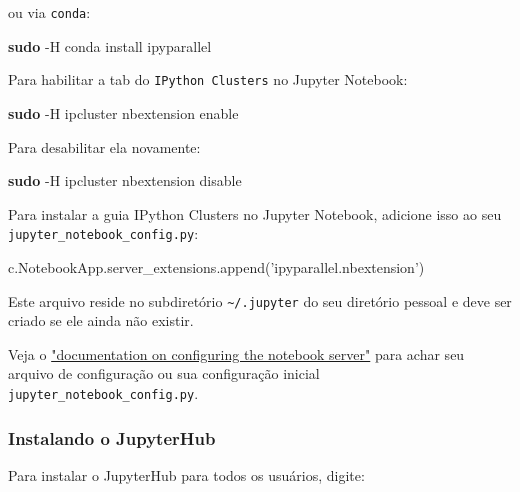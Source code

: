 \documentclass[11pt]{article}
\newenvironment{Shaded}{}{}
\newcommand{\KeywordTok}[1]{\textcolor[rgb]{0.00,0.44,0.13}{\textbf{{#1}}}}
\newcommand{\StringTok}[1]{\textcolor[rgb]{0.25,0.44,0.63}{{#1}}}
\newcommand{\NormalTok}[1]{{#1}}
\begin{document}
ou via \texttt{conda}:

\begin{Shaded}
\begin{Highlighting}[]
\KeywordTok{sudo} \NormalTok{-H conda install ipyparallel}
\end{Highlighting}
\end{Shaded}

Para habilitar a tab do \texttt{IPython\ Clusters} no Jupyter Notebook:

\begin{Shaded}
\begin{Highlighting}[]
\KeywordTok{sudo} \NormalTok{-H ipcluster nbextension enable}
\end{Highlighting}
\end{Shaded}

Para desabilitar ela novamente:

\begin{Shaded}
\begin{Highlighting}[]
\KeywordTok{sudo} \NormalTok{-H ipcluster nbextension disable}
\end{Highlighting}
\end{Shaded}

Para instalar a guia IPython Clusters no Jupyter Notebook, adicione isso
ao seu \texttt{jupyter\_notebook\_config.py}:

\begin{Shaded}
\begin{Highlighting}[]
\NormalTok{c.NotebookApp.server_extensions.append(}\StringTok{'ipyparallel.nbextension'}\NormalTok{)}
\end{Highlighting}
\end{Shaded}

Este arquivo reside no subdiretório \texttt{\textasciitilde{}/.jupyter}
do seu diretório pessoal e deve ser criado se ele ainda não existir.

Veja o
\href{https://jupyter-notebook.readthedocs.io/en/latest/public_server.html}{"documentation
on configuring the notebook server"} para achar seu arquivo de
configuração ou sua configuração inicial
\texttt{jupyter\_notebook\_config.py}.

\subsubsection{Instalando o JupyterHub}\label{instalando-o-jupyterhub}

Para instalar o JupyterHub para todos os usuários, digite:
\end{document}
